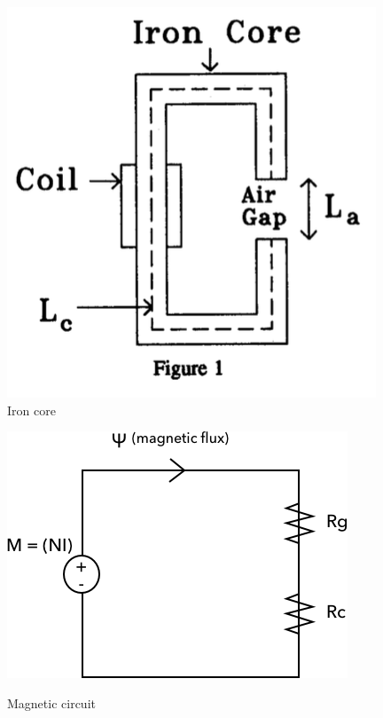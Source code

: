 \documentclass[11pt]{article}
\begin{document}
\begin{figure}[!hbp]
	\begin{center}
		\begin{minipage}{ 0.4\textwidth}
			\includegraphics[width= \textwidth]{iron_core.png}\\
			\caption{\label{fig:iron_core}Iron core}
		\end{minipage}
		\quad
		\begin{minipage}{ 0.5\textwidth}
			\includegraphics[width=\textwidth]{mag_circ.png}\\
    			\caption{\label{fig:mag_circ}Magnetic circuit}
		\end{minipage}
	\end{center}
\end{figure}
\end{document}
